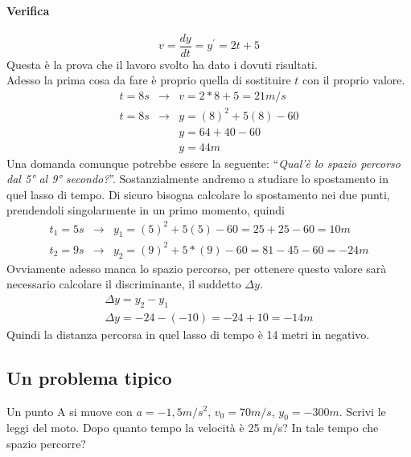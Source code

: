 \paragraph{Verifica} \[v=\frac{dy}{dt}=y^\prime=2t+5\] Questa è la prova che il
lavoro svolto ha dato i dovuti risultati.\\
Adesso la prima cosa da fare è proprio quella di sostituire $t$ con il proprio
valore.
\begin{equation}
	\begin{matrix}
			t=8s&\to&v=2*8+5=21m/s\\
			t=8s&\to&y=(8)^2+5(8)-60\\
			&&y=64+40-60\\
			&&y=44m
	\end{matrix}
\end{equation}
Una domanda comunque potrebbe essere la seguente: ``\textit{Qual'è lo spazio
percorso dal 5° al 9° secondo?}''. Sostanzialmente andremo a studiare lo
spostamento in quel lasso di tempo. Di sicuro bisogna calcolare lo spostamento
nei due punti, prendendoli singolarmente in un primo momento, quindi
\begin{equation}
	\begin{matrix}
		t_1=5s&\to&y_1=(5)^2+5(5)-60=25+25-60=10m\\
		t_2=9s&\to&y_2=(9)^2+5*(9)-60=81-45-60=-24m
	\end{matrix}
\end{equation}
Ovviamente adesso manca lo spazio percorso, per ottenere questo valore sarà
necessario calcolare il discriminante, il suddetto $\Delta y$.
\begin{equation}
	\boxed{
		\begin{matrix}
			\Delta y=y_2-y_1\\
			\Delta y=-24-(-10)=-24+10=-14m
		\end{matrix}
	}
\end{equation}
Quindi la distanza percorsa in quel lasso di tempo è 14 metri in negativo.
\subsection{Un problema tipico}
Un punto A si muove con $a=-1,5m/s^2$, $v_0=70m/s$, $y_0=-300m$. Scrivi le leggi
del moto. Dopo quanto tempo la velocità è 25 m/s? In tale tempo che spazio
percorre?

